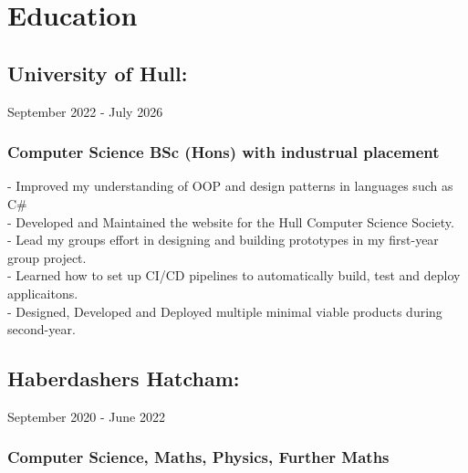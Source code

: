 \section{Education}

\subsection{University of Hull:} September 2022 - July 2026 \\

\subsubsection{Computer Science BSc (Hons) with industrual placement}

-\: Improved my understanding of OOP and design patterns in languages such as C\#\\
-\: Developed and Maintained the website for the Hull Computer Science Society. \\
-\: Lead my groups effort in designing and building prototypes in my first-year group project. \\ 
-\: Learned how to set up CI/CD pipelines to automatically build, test and deploy applicaitons. \\
-\: Designed, Developed and Deployed multiple minimal viable products during second-year. 

\vspace{10pt}
\subsection{Haberdashers Hatcham:} September 2020 - June 2022 \\ 

\subsubsection{Computer Science, Maths, Physics, Further Maths}
